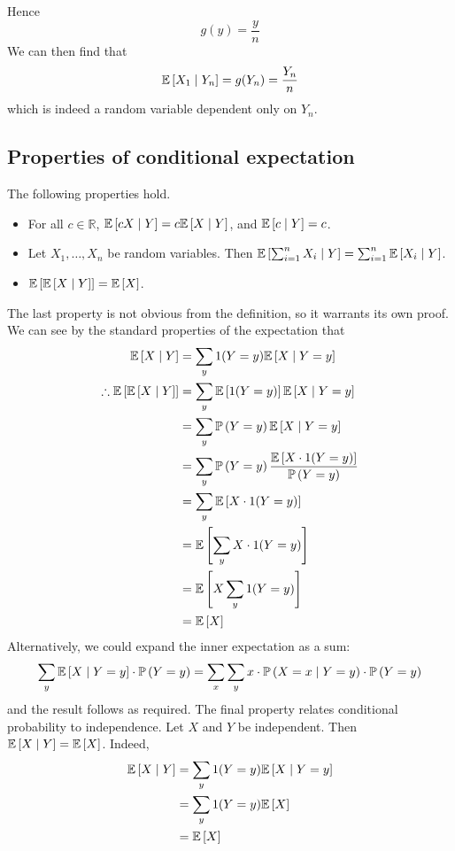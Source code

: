 Hence
\[
	g(y) = \frac{y}{n}
\]
We can then find that
\[
	\mathbb{E}\left[{X_1 \mid Y_n}\right] = g(Y_n) = \frac{Y_n}{n}
\]
which is indeed a random variable dependent only on \(Y_n\).

\subsection{Properties of conditional expectation}
The following properties hold.
\begin{itemize}
	\item For all \(c \in \mathbb R\), \(\mathbb{E}\left[{cX \mid Y}\right] = c\mathbb{E}\left[{X \mid Y}\right]\), and \(\mathbb{E}\left[{c \mid Y}\right] = c\).
	\item Let \(X_1, \dots, X_n\) be random variables.
	      Then \(\mathbb{E}\left[{\sum_{i=1}^n X_i \mid Y}\right] = \sum_{i=1}^n \mathbb{E}\left[{X_i \mid Y}\right]\).
	\item \(\mathbb{E}\left[{\mathbb{E}\left[{X \mid Y}\right]}\right] = \mathbb{E}\left[{X}\right]\).
\end{itemize}
The last property is not obvious from the definition, so it warrants its own proof.
We can see by the standard properties of the expectation that
\begin{align*}
	\mathbb{E}\left[{X \mid Y}\right]                     & = \sum_y 1(Y = y) \mathbb{E}\left[{X \mid Y = y}\right]                              \\
	\therefore \mathbb{E}\left[{\mathbb{E}\left[{X \mid Y}\right]}\right] & = \sum_y \mathbb{E}\left[{1(Y = y)}\right] \mathbb{E}\left[{X \mid Y = y}\right]                     \\
	                                      & = \sum_y \mathbb{P}\left({Y = y}\right) \mathbb{E}\left[{X \mid Y = y}\right]                          \\
	                                      & = \sum_y \mathbb{P}\left({Y = y}\right) \frac{\mathbb{E}\left[{X \cdot 1(Y = y)}\right]}{\mathbb{P}\left({Y = y}\right)} \\
	                                      & = \sum_y \mathbb{E}\left[{X \cdot 1(Y = y)}\right]                                   \\
	                                      & = \mathbb{E}\left[{\sum_y X \cdot 1(Y = y)}\right]                                   \\
	                                      & = \mathbb{E}\left[{X \sum_y 1(Y = y)}\right]                                         \\
	                                      & = \mathbb{E}\left[{X}\right]                                                         \\
\end{align*}
Alternatively, we could expand the inner expectation as a sum:
\[
	\sum_y \mathbb{E}\left[{X \mid Y = y}\right] \cdot \mathbb{P}\left({Y = y}\right) = \sum_x \sum_y x \cdot \mathbb{P}\left({X = x \mid Y = y}\right) \cdot \mathbb{P}\left({Y = y}\right)
\]
and the result follows as required.
The final property relates conditional probability to independence.
Let \(X\) and \(Y\) be independent.
Then \(\mathbb{E}\left[{X \mid Y}\right] = \mathbb{E}\left[{X}\right]\).
Indeed,
\begin{align*}
	\mathbb{E}\left[{X \mid Y}\right] & = \sum_y 1(Y = y) \mathbb{E}\left[{X \mid Y = y}\right] \\
	                  & = \sum_y 1(Y = y) \mathbb{E}\left[{X}\right]            \\
	                  & = \mathbb{E}\left[{X}\right]                            \\
\end{align*}

